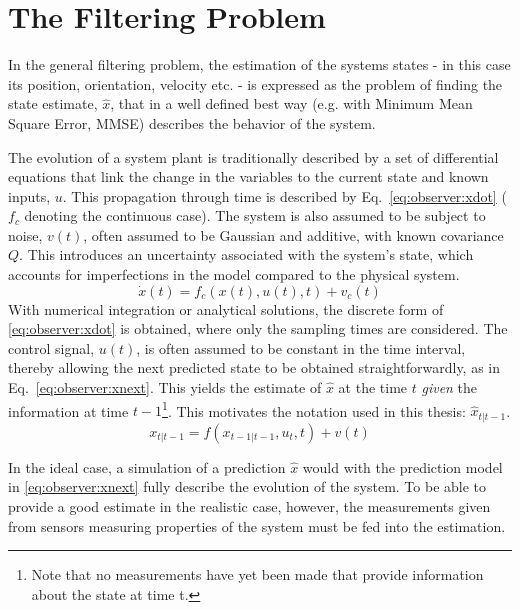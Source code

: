 \section{The Filtering Problem}
\label{sec:observer:filtering}
    In the general filtering problem, the estimation of the systems states - in this case
    its position, orientation, velocity etc. - is
    expressed as the problem of finding the state estimate,
    $\hat{x}$, that in a well defined best way (e.g. with Minimum Mean Square Error, MMSE)
    describes the behavior of the system.

    The evolution of a system plant is traditionally described by a set of differential equations
    that link the change in the variables to the current state and known inputs, $u$.
    This propagation through time is described by Eq.~\eqref{eq:observer:xdot} ($f_{c}$ denoting the continuous case).
    The system is also assumed to be subject to noise, $v(t)$, often assumed to
    be Gaussian and additive, with known covariance $Q$.
    This introduces an uncertainty associated with the system's state, which accounts
    for imperfections in the model compared to the physical system.
    \begin{equation}
        \label{eq:observer:xdot}
        \dot{x}(t) = f_{c}(x(t),u(t),t) + v_{c}(t)
    \end{equation}
    With numerical integration or analytical solutions, the discrete form of
    \eqref{eq:observer:xdot} is obtained, where only the sampling times are considered.
    The control signal, $u(t)$, is often assumed to be constant in the time interval,
    thereby allowing the next predicted state to be obtained straightforwardly, as in Eq.~\eqref{eq:observer:xnext}.
    This yields the estimate of $\hat{x}$ at the time $t$ \textit{given} the information at time
    $t-1$\footnote{Note that no measurements have yet been made that provide information about the state at time t.}.
    This motivates the notation used in this thesis: $\hat{x}_{t|t-1}$.
    \begin{equation}
        \label{eq:observer:xnext}
        x_{t|t-1} = f(x_{t-1|t-1},u_{t},t) + v(t)
    \end{equation}

    In the ideal case, a simulation of a prediction $\hat{x}$ would
    with the prediction model in \eqref{eq:observer:xnext} fully describe
    the evolution of the system.
    To be able to provide a good estimate in the realistic case, however,
    the measurements given from sensors measuring properties of the system
    must be fed into the estimation.

